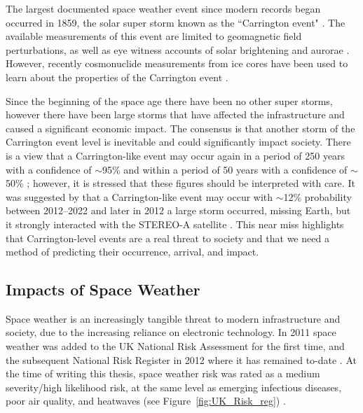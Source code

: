 The largest documented space weather event since modern records began occurred in 1859, the solar super storm known as the ``Carrington event" \citep{carrington_description_1859}. The available measurements of this event are limited to geomagnetic field perturbations, as well as eye witness accounts of solar brightening and aurorae \citep{cannon_extreme_2013}. However, recently cosmonuclide measurements from ice cores have been used to learn about the properties of the Carrington event \citep{riley_probability_2012}.%

Since the beginning of the space age there have been no other super storms, however there have been large storms that have affected the infrastructure and caused a significant economic impact. The consensus is that another storm of the Carrington event level is inevitable and could significantly impact society. There is a view that a Carrington-like event may occur again in a period of 250 years with a confidence of $\sim$95\% and within a period of 50 years with a confidence of $\sim$50\% \citep{cannon_extreme_2013}; however, it is stressed that these figures should be interpreted with care. It was suggested by \cite{riley_probability_2012} that a Carrington-like event may occur with $\sim$12\% probability between 2012--2022 and later in 2012 a large storm occurred, missing Earth, but it strongly interacted with the STEREO-A satellite \citep{russell_very_2013}. This near miss highlights that Carrington-level events are a real threat to society and that we need a method of predicting their occurrence, arrival, and impact.



\subsection{Impacts of Space Weather}
\label{sw_impacts}
Space weather is an increasingly tangible threat to modern infrastructure and society, due to the increasing reliance on electronic technology. In 2011 space weather was added to the UK National Risk Assessment for the first time, and the subsequent National Risk Register in 2012 \citep{bis_space_2015} where it has remained to-date \citep{hm_government_national_2020}. At the time of writing this thesis, space weather risk was rated as a medium severity/high likelihood risk, at the same level as emerging infectious diseases, poor air quality, and heatwaves (see Figure~\ref{fig:UK_Risk_reg}) \citep{cabinet_office_national_2017}.

